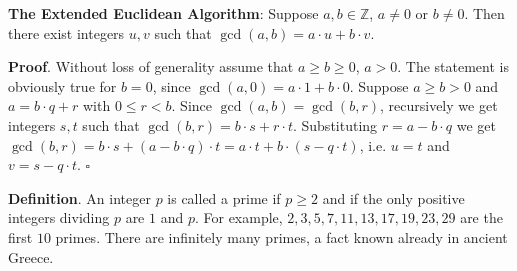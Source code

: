 \documentclass[10pt,varwidth=6in,margin=0.2in,preview]{standalone}
\begin{document}
\begin{flushleft}

\textbf{The Extended Euclidean Algorithm}: Suppose $a, b \in \mathbb{Z}$, $a \neq 0$ or $b \neq 0$. Then there exist integers $u, v$ such that $\gcd(a, b) = a \cdot u + b \cdot v$.

\textbf{Proof}.
Without loss of generality assume that $a \ge b \ge 0$, $a > 0$.
The statement is obviously true for $b = 0$, since $\gcd(a, 0) = a \cdot 1 + b \cdot 0$.
Suppose $a \ge b > 0$ and $a = b \cdot q + r$ with $0 \le r < b$.
Since $\gcd(a, b) = \gcd(b, r)$, recursively we get integers $s, t$ such that $\gcd(b, r) = b \cdot s + r \cdot t$.
Substituting $r = a - b \cdot q$ we get $\gcd(b, r) = b \cdot s + (a - b \cdot q) \cdot t = a \cdot t + b \cdot (s - q \cdot t)$, i.e. $u = t$ and $v = s - q \cdot t$. $\square$

\textbf{Definition}. An integer $p$ is called a prime if $p \ge 2$ and if the only positive integers dividing $p$ are $1$ and $p$. For example, $2, 3, 5, 7, 11, 13, 17, 19, 23, 29$ are the first $10$ primes. There are infinitely many primes, a fact known already in ancient Greece.


\end{flushleft}
\end{document}
